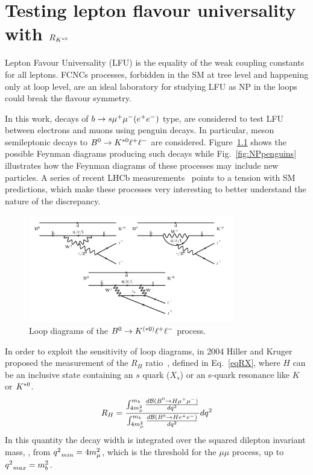 \chapter{Testing lepton flavour universality with $R_{{{K}^{*0}}}$}
\label{sec:RKst_theory}

Lepton Favour Universality (LFU) is the equality of the weak coupling constants for all leptons.
FCNCs processes, forbidden in the SM at tree level and happening
only at loop level, are an ideal laboratory for studying LFU as NP in the loops could break the flavour symmetry.
 
In this work, decays of $b \rightarrow s{\mu^+\mu^-} (e^+ e^-)$ type, are considered to test LFU
between electrons and muons using penguin decays.
In particular, \Bz meson semileptonic decays to ${{B}^0}\rightarrow{\ensuremath{{K}^{*0}}}\ell^+ \ell^-$ are considered.
Figure~\ref{fig:RKpenguins} shows the possible Feynman diagrams 
producing such decays while Fig.~\ref{fig:NPpenguins} illustrates how the Feynman 
diagrams of these processes may include new particles. 
A series of recent LHCb measurements~\cite{TomRDreview}
points to a tension with SM predictions, which make these processes very interesting
to better understand the nature of the discrepancy.
%
\begin{figure}[h]
\centering \includegraphics[width=0.8\textwidth]{RKst/figs/penguins3.png}
\caption{Loop diagrams of the ${{B}^0} \rightarrow K^{(*0)}\ell^+ \ell^-$ process.}
\label{fig:RKpenguins}
\end{figure}

In order to exploit the sensitivity of loop diagrams, in 2004 Hiller and Kruger proposed the measurement 
of the $R_H$ ratio~\cite{Hiller:2003js}, defined in Eq.~\ref{eqRX}, where $H$ can be an inclusive state containing 
an $s$ quark ($X_s$) or an s-quark resonance like $K$ or ${{K}^{*0}}$.
\begin{equation}
\label{eqRX}
R_{H} = \frac{\int_{4m_{\mu}^2}^{m_b} \frac{ d{\cal B}({{B}^0} \rightarrow H {\mu^+\mu^-}) }{d{q^2}}}{ \int_{4m_{\mu}^2}^{m_b}\frac{ d{\cal B}({{B}^0} \rightarrow H{e^+e^-}) }{d{q^2}}} d{q^2}
\end{equation}
In this quantity the decay width is integrated over the squared dilepton invariant mass, \qsq, from 
${q^2}_{min} = 4m_{\mu}^2$, which is the threshold for the $\mu\mu$ process, up to \mbox{${q^2}_{max} = m_b^2$.} 

